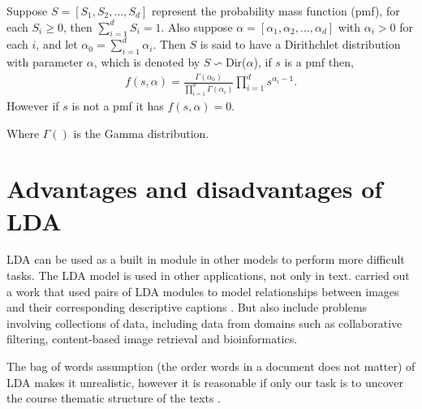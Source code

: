 Suppose $S=[S_1,S_2,...,S_d] $  represent the  probability mass function (pmf), for each $S_i\geq 0$, then $\sum _{i=1}^{d}S_i=1$. Also suppose $\alpha=[\alpha_1,\alpha_2,...,\alpha_d]$ with $\alpha_i>0$ for each $i$, and let $\alpha_0=\sum _{i=1}^{d}\alpha_i$. Then $S$ is said to have a Dirithchlet distribution with parameter $\alpha$, which is denoted by $S \backsim $Dir($\alpha$), if $s$ is a  pmf then,
\begin{align}
f(s,\alpha)=\frac{\Gamma(\alpha_0)}{\prod_{i=1}^{d}\Gamma(\alpha_i)}\prod_{i=1}^{d}s^{\alpha_i -1}.
\end{align}
However if $s$ is not a pmf  it has $f(s,\alpha)=0\text{.}$

Where $\Gamma()$ is the Gamma distribution.
\section{Advantages and disadvantages of LDA} 
LDA can be used as a built in module in other models to perform more difficult tasks.
The LDA model is used in other applications, not only in text. \cite{blei2003modeling} carried out a  work that used pairs of LDA modules to
model relationships between images and their corresponding descriptive captions .
But also include problems involving collections of data, including data from domains such as collaborative filtering,
content-based image retrieval and bioinformatics.
\begin{flushleft}
The bag of words assumption (the order words in a document does not matter) of LDA makes it unrealistic, however it is reasonable if only our task is to uncover the course thematic structure of the texts \cite{blei2012surveying}.
\end{flushleft}
